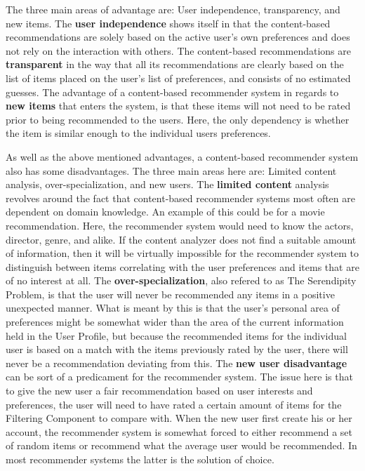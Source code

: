 The three main areas of advantage are: User independence, transparency, and new items.\newline
The \textbf{user independence} shows itself in that the content-based recommendations are solely based on the active user's own preferences and does not rely on the interaction with others.\newline
The content-based recommendations are \textbf{transparent} in the way that all its recommendations are clearly based on the list of items placed on the user's list of preferences, and consists of no estimated guesses.\newline
The advantage of a content-based recommender system in regards to \textbf{new items} that enters the system, is that these items will not need to be rated prior to being recommended to the users. Here, the only dependency is whether the item is similar enough to the individual users preferences.\newline

As well as the above mentioned advantages, a content-based recommender system also has some disadvantages. The three main areas here are: Limited content analysis, over-specialization, and new users.\newline
The \textbf{limited content} analysis revolves around the fact that content-based recommender systems most often are dependent on domain knowledge. An example of this could be for a movie recommendation. Here, the recommender system would need to know the actors, director, genre, and alike. If the content analyzer does not find a suitable amount of information, then it will be virtually impossible for the recommender system to distinguish between items correlating with the user preferences and items that are of no interest at all.\newline
The \textbf{over-specialization}, also refered to as The Serendipity Problem, is that the user will never be recommended any items in a positive unexpected manner. What is meant by this is that the user's personal area of preferences might be somewhat wider than the area of the current information held in the User Profile, but because the recommended items for the individual user is based on a match with the items previously rated by the user, there will never be a recommendation deviating from this.\newline
The \textbf{new user disadvantage} can be sort of a predicament for the recommender system. The issue here is that to give the new user a fair recommendation based on user interests and preferences, the user will need to have rated a certain amount of items for the Filtering Component to compare with. When the new user first create his or her account, the recommender system is somewhat forced to either recommend a set of random items or recommend what the average user would be recommended. In most recommender systems the latter is the solution of choice.


